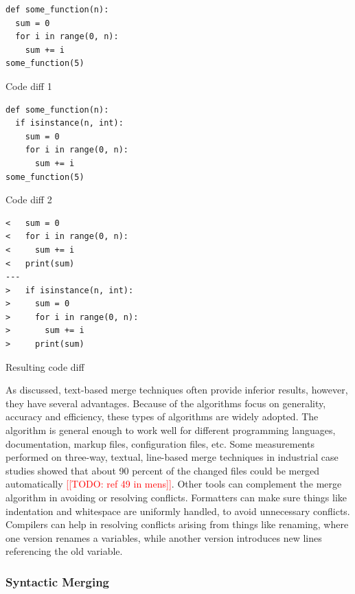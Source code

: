 \documentclass[a4paper,english]{ifimaster}
\newcommand{\todo}[1]{\textcolor{red}{[[TODO: #1]]}\PackageWarning{TODO:}{#1!}}
\begin{document}
\begin{listing}
	\begin{verbatim}
def some_function(n):
  sum = 0
  for i in range(0, n):
    sum += i
some_function(5)

  \end{verbatim}
	\caption{Code diff 1}
	\label{lst:code_diff_1}
\end{listing}

\begin{listing}
	\begin{verbatim}
def some_function(n):
  if isinstance(n, int):
    sum = 0
    for i in range(0, n):
      sum += i
some_function(5)
  \end{verbatim}
	\caption{Code diff 2}
	\label{lst:code_diff_2}
\end{listing}

\begin{listing}
	\begin{verbatim}
<   sum = 0
<   for i in range(0, n):
<     sum += i
<   print(sum)
---
>   if isinstance(n, int):
>     sum = 0
>     for i in range(0, n):
>       sum += i
>     print(sum)
  \end{verbatim}
	\caption{Resulting code diff}
	\label{lst:result_code_diff}
\end{listing}

As discussed, text-based merge techniques often provide inferior results, however, they have several advantages. Because of the algorithms focus on generality, accuracy and efficiency, these types of algorithms are widely adopted. The algorithm is general enough to work well for different programming languages, documentation, markup files, configuration files, etc. Some measurements performed on three-way, textual, line-based merge techniques in industrial case studies showed that about 90 percent of the changed files could be merged automatically \todo{ref 49 in mens}. Other tools can complement the merge algorithm in avoiding or resolving conflicts. Formatters can make sure things like indentation and whitespace are uniformly handled, to avoid unnecessary conflicts. Compilers can help in resolving conflicts arising from things like renaming, where one version renames a variables, while another version introduces new lines referencing the old variable.

\subsubsection{Syntactic Merging}%
\label{ssub:syntactic_merging}
\end{document}
